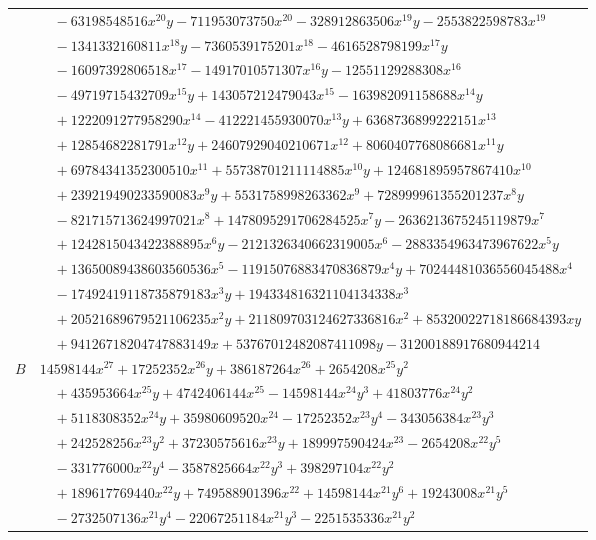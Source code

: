\documentclass[11pt]{article}
\begin{document}
\begin{longtable}{@{}ll@{}}
 & $\quad -63198548516x^{20}y-711953073750x^{20}-328912863506x^{19}y-2553822598783x^{19}$\\
 & $\quad -1341332160811x^{18}y-7360539175201x^{18}-4616528798199x^{17}y$\\
 & $\quad -16097392806518x^{17}-14917010571307x^{16}y-12551129288308x^{16}$\\
 & $\quad -49719715432709x^{15}y+143057212479043x^{15}-163982091158688x^{14}y$\\
 & $\quad +1222091277958290x^{14}-412221455930070x^{13}y+6368736899222151x^{13}$\\
 & $\quad +12854682281791x^{12}y+24607929040210671x^{12}+8060407768086681x^{11}y$\\
 & $\quad +69784341352300510x^{11}+55738701211114885x^{10}y+124681895957867410x^{10}$\\
 & $\quad +239219490233590083x^{9}y+5531758998263362x^{9}+728999961355201237x^{8}y$\\
 & $\quad -821715713624997021x^{8}+1478095291706284525x^{7}y-2636213675245119879x^{7}$\\
 & $\quad +1242815043422388895x^{6}y-2121326340662319005x^{6}-2883354963473967622x^{5}y$\\
 & $\quad +13650089438603560536x^{5}-11915076883470836879x^{4}y+70244481036556045488x^{4}$\\
 & $\quad -17492419118735879183x^{3}y+194334816321104134338x^{3}$\\
 & $\quad +20521689679521106235x^{2}y+211809703124627336816x^{2}+85320022718186684393xy$\\
 & $\quad +94126718204747883149x+53767012482087411098y-31200188917680944214$\\
$B$ & $14598144x^{27}+17252352x^{26}y+386187264x^{26}+2654208x^{25}y^{2}$\\
 & $\quad +435953664x^{25}y+4742406144x^{25}-14598144x^{24}y^{3}+41803776x^{24}y^{2}$\\
 & $\quad +5118308352x^{24}y+35980609520x^{24}-17252352x^{23}y^{4}-343056384x^{23}y^{3}$\\
 & $\quad +242528256x^{23}y^{2}+37230575616x^{23}y+189997590424x^{23}-2654208x^{22}y^{5}$\\
 & $\quad -331776000x^{22}y^{4}-3587825664x^{22}y^{3}+398297104x^{22}y^{2}$\\
 & $\quad +189617769440x^{22}y+749588901396x^{22}+14598144x^{21}y^{6}+19243008x^{21}y^{5}$\\
 & $\quad -2732507136x^{21}y^{4}-22067251184x^{21}y^{3}-2251535336x^{21}y^{2}$\\

\end{longtable}
\end{document}
